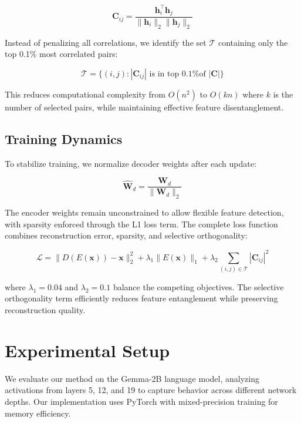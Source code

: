 \documentclass{article} %
\begin{document}
\begin{equation}
    \mathbf{C}_{ij} = \frac{\mathbf{h}_i^\top \mathbf{h}_j}{\|\mathbf{h}_i\|_2 \|\mathbf{h}_j\|_2}
\end{equation}

Instead of penalizing all correlations, we identify the set $\mathcal{T}$ containing only the top 0.1\% most correlated pairs:

\begin{equation}
    \mathcal{T} = \{(i,j) : |\mathbf{C}_{ij}| \text{ is in top 0.1\% of }|\mathbf{C}|\}
\end{equation}

This reduces computational complexity from $O(n^2)$ to $O(kn)$ where $k$ is the number of selected pairs, while maintaining effective feature disentanglement.

\subsection{Training Dynamics}
To stabilize training, we normalize decoder weights after each update:

\begin{equation}
    \hat{\mathbf{W}}_d = \frac{\mathbf{W}_d}{\|\mathbf{W}_d\|_2}
\end{equation}

The encoder weights remain unconstrained to allow flexible feature detection, with sparsity enforced through the L1 loss term. The complete loss function combines reconstruction error, sparsity, and selective orthogonality:

\begin{equation}
    \mathcal{L} = \|D(E(\mathbf{x})) - \mathbf{x}\|_2^2 + \lambda_1 \|E(\mathbf{x})\|_1 + \lambda_2 \sum_{(i,j) \in \mathcal{T}} |\mathbf{C}_{ij}|^2
\end{equation}

where $\lambda_1=0.04$ and $\lambda_2=0.1$ balance the competing objectives. The selective orthogonality term efficiently reduces feature entanglement while preserving reconstruction quality.

\section{Experimental Setup}
\label{sec:experimental}

We evaluate our method on the Gemma-2B language model, analyzing activations from layers 5, 12, and 19 to capture behavior across different network depths. Our implementation uses PyTorch with mixed-precision training for memory efficiency.
\end{document}
